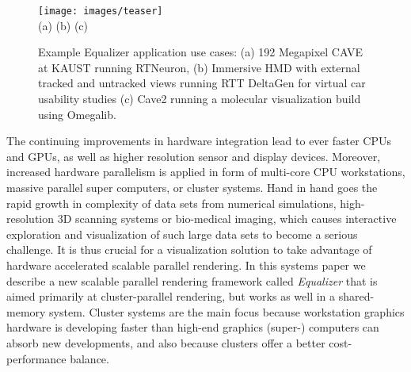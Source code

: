 \documentclass[10pt,journal,compsoc]{IEEEtran}
\begin{document}
\begin{figure}[ht]\center
  \texttt{[image: images/teaser]} \\
  (a) \hfil \hfil (b) \hfil \hfil (c)
  \vspace{-2mm}
  \caption{Example Equalizer application use cases: (a) 192 Megapixel CAVE at
    KAUST running RTNeuron, (b) Immersive HMD with external tracked and
    untracked views running RTT DeltaGen for virtual car usability studies (c)
    Cave2 running a molecular visualization build using Omegalib.}
  \label{FIG_teaser}
\end{figure}


The continuing improvements in hardware integration lead to ever faster CPUs and GPUs, as well as higher resolution sensor and display devices. Moreover, increased hardware parallelism is applied in form of multi-core CPU workstations, massive parallel super computers, or cluster systems. Hand in hand goes the rapid growth in complexity of data sets from numerical simulations, high-resolution 3D scanning systems or bio-medical imaging, which causes interactive exploration and visualization of such large data sets to become a serious challenge. It is thus crucial for a visualization solution to take advantage of hardware accelerated scalable parallel rendering. In this systems paper we describe a new scalable parallel rendering framework called {\em Equalizer} that is aimed primarily at cluster-parallel rendering, but works as well in a shared-memory system. Cluster systems are the main focus  because workstation graphics hardware is developing faster than high-end graphics (super-) computers can absorb new developments, and also because clusters offer a better cost-performance balance.
\end{document}
